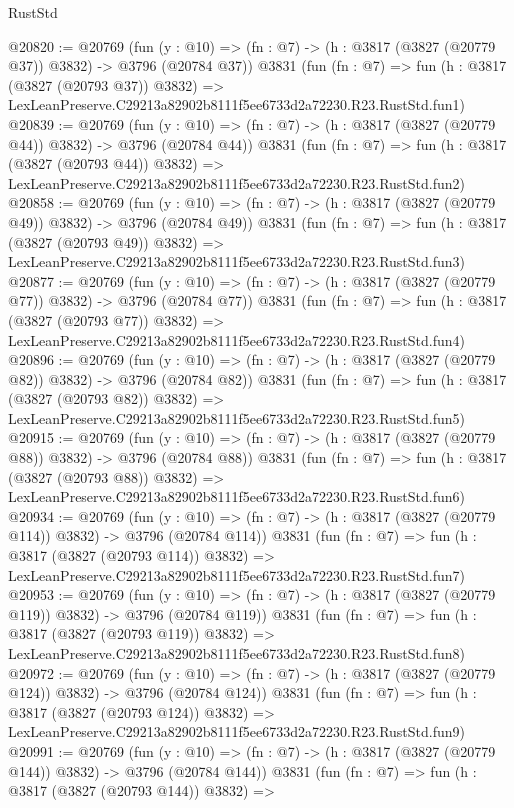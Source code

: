 \begin{lexlean}{RustStd}
\begin{coremodule}
@20820 := @20769
    (fun (y : @10) => (fn : @7) -> (h : @3817 (@3827 (@20779 @37)) @3832) -> @3796 (@20784 @37))
    @3831
    (fun (fn : @7) =>
    fun (h : @3817 (@3827 (@20793 @37)) @3832) =>
    LexLeanPreserve.C29213a82902b8111f5ee6733d2a72230.R23.RustStd.fun1)
@20839 := @20769
    (fun (y : @10) => (fn : @7) -> (h : @3817 (@3827 (@20779 @44)) @3832) -> @3796 (@20784 @44))
    @3831
    (fun (fn : @7) =>
    fun (h : @3817 (@3827 (@20793 @44)) @3832) =>
    LexLeanPreserve.C29213a82902b8111f5ee6733d2a72230.R23.RustStd.fun2)
@20858 := @20769
    (fun (y : @10) => (fn : @7) -> (h : @3817 (@3827 (@20779 @49)) @3832) -> @3796 (@20784 @49))
    @3831
    (fun (fn : @7) =>
    fun (h : @3817 (@3827 (@20793 @49)) @3832) =>
    LexLeanPreserve.C29213a82902b8111f5ee6733d2a72230.R23.RustStd.fun3)
@20877 := @20769
    (fun (y : @10) => (fn : @7) -> (h : @3817 (@3827 (@20779 @77)) @3832) -> @3796 (@20784 @77))
    @3831
    (fun (fn : @7) =>
    fun (h : @3817 (@3827 (@20793 @77)) @3832) =>
    LexLeanPreserve.C29213a82902b8111f5ee6733d2a72230.R23.RustStd.fun4)
@20896 := @20769
    (fun (y : @10) => (fn : @7) -> (h : @3817 (@3827 (@20779 @82)) @3832) -> @3796 (@20784 @82))
    @3831
    (fun (fn : @7) =>
    fun (h : @3817 (@3827 (@20793 @82)) @3832) =>
    LexLeanPreserve.C29213a82902b8111f5ee6733d2a72230.R23.RustStd.fun5)
@20915 := @20769
    (fun (y : @10) => (fn : @7) -> (h : @3817 (@3827 (@20779 @88)) @3832) -> @3796 (@20784 @88))
    @3831
    (fun (fn : @7) =>
    fun (h : @3817 (@3827 (@20793 @88)) @3832) =>
    LexLeanPreserve.C29213a82902b8111f5ee6733d2a72230.R23.RustStd.fun6)
@20934 := @20769
    (fun (y : @10) => (fn : @7) -> (h : @3817 (@3827 (@20779 @114)) @3832) -> @3796 (@20784 @114))
    @3831
    (fun (fn : @7) =>
    fun (h : @3817 (@3827 (@20793 @114)) @3832) =>
    LexLeanPreserve.C29213a82902b8111f5ee6733d2a72230.R23.RustStd.fun7)
@20953 := @20769
    (fun (y : @10) => (fn : @7) -> (h : @3817 (@3827 (@20779 @119)) @3832) -> @3796 (@20784 @119))
    @3831
    (fun (fn : @7) =>
    fun (h : @3817 (@3827 (@20793 @119)) @3832) =>
    LexLeanPreserve.C29213a82902b8111f5ee6733d2a72230.R23.RustStd.fun8)
@20972 := @20769
    (fun (y : @10) => (fn : @7) -> (h : @3817 (@3827 (@20779 @124)) @3832) -> @3796 (@20784 @124))
    @3831
    (fun (fn : @7) =>
    fun (h : @3817 (@3827 (@20793 @124)) @3832) =>
    LexLeanPreserve.C29213a82902b8111f5ee6733d2a72230.R23.RustStd.fun9)
@20991 := @20769
    (fun (y : @10) => (fn : @7) -> (h : @3817 (@3827 (@20779 @144)) @3832) -> @3796 (@20784 @144))
    @3831
    (fun (fn : @7) =>
    fun (h : @3817 (@3827 (@20793 @144)) @3832) =>

\end{coremodule}
\end{lexlean}
